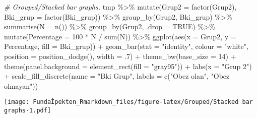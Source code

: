 \documentclass[
]{article}
\newenvironment{Shaded}{\begin{snugshade}}{\end{snugshade}}
\newcommand{\AttributeTok}[1]{\textcolor[rgb]{0.77,0.63,0.00}{#1}}
\newcommand{\CommentTok}[1]{\textcolor[rgb]{0.56,0.35,0.01}{\textit{#1}}}
\newcommand{\ConstantTok}[1]{\textcolor[rgb]{0.00,0.00,0.00}{#1}}
\newcommand{\DecValTok}[1]{\textcolor[rgb]{0.00,0.00,0.81}{#1}}
\newcommand{\FunctionTok}[1]{\textcolor[rgb]{0.00,0.00,0.00}{#1}}
\newcommand{\NormalTok}[1]{#1}
\newcommand{\SpecialCharTok}[1]{\textcolor[rgb]{0.00,0.00,0.00}{#1}}
\newcommand{\StringTok}[1]{\textcolor[rgb]{0.31,0.60,0.02}{#1}}
\begin{document}
\begin{Shaded}
\begin{Highlighting}[]
\CommentTok{\# Grouped/Stacked bar graphs.}
\NormalTok{tmp }\SpecialCharTok{\%\textgreater{}\%}
  \FunctionTok{mutate}\NormalTok{(}\AttributeTok{Grup2 =} \FunctionTok{factor}\NormalTok{(Grup2), }\AttributeTok{Bki\_grup =} \FunctionTok{factor}\NormalTok{(Bki\_grup)) }\SpecialCharTok{\%\textgreater{}\%}
  \FunctionTok{group\_by}\NormalTok{(Grup2, Bki\_grup) }\SpecialCharTok{\%\textgreater{}\%}
  \FunctionTok{summarise}\NormalTok{(}\AttributeTok{N =} \FunctionTok{n}\NormalTok{()) }\SpecialCharTok{\%\textgreater{}\%}
  \FunctionTok{group\_by}\NormalTok{(Grup2, }\AttributeTok{.drop =} \ConstantTok{TRUE}\NormalTok{) }\SpecialCharTok{\%\textgreater{}\%}
  \FunctionTok{mutate}\NormalTok{(}\AttributeTok{Percentage =} \DecValTok{100} \SpecialCharTok{*}\NormalTok{ N }\SpecialCharTok{/} \FunctionTok{sum}\NormalTok{(N)) }\SpecialCharTok{\%\textgreater{}\%}
  \FunctionTok{ggplot}\NormalTok{(}\FunctionTok{aes}\NormalTok{(}\AttributeTok{x =}\NormalTok{ Grup2, }\AttributeTok{y =}\NormalTok{ Percentage, }\AttributeTok{fill =}\NormalTok{ Bki\_grup)) }\SpecialCharTok{+} 
    \FunctionTok{geom\_bar}\NormalTok{(}\AttributeTok{stat =} \StringTok{"identity"}\NormalTok{, }\AttributeTok{colour =} \StringTok{"white"}\NormalTok{, }
             \AttributeTok{position =} \FunctionTok{position\_dodge}\NormalTok{(), }\AttributeTok{width =}\NormalTok{ .}\DecValTok{7}\NormalTok{) }\SpecialCharTok{+}
    \FunctionTok{theme\_bw}\NormalTok{(}\AttributeTok{base\_size =} \DecValTok{14}\NormalTok{) }\SpecialCharTok{+} 
    \FunctionTok{theme}\NormalTok{(}\AttributeTok{panel.background =} \FunctionTok{element\_rect}\NormalTok{(}\AttributeTok{fill =} \StringTok{"gray95"}\NormalTok{)) }\SpecialCharTok{+}
    \FunctionTok{labs}\NormalTok{(}\AttributeTok{x =} \StringTok{"Grup 2"}\NormalTok{) }\SpecialCharTok{+} 
    \FunctionTok{scale\_fill\_discrete}\NormalTok{(}\AttributeTok{name =} \StringTok{"Bki Grup"}\NormalTok{, }
                        \AttributeTok{labels =} \FunctionTok{c}\NormalTok{(}\StringTok{"Obez olan"}\NormalTok{, }\StringTok{"Obez olmayan"}\NormalTok{))}
\end{Highlighting}
\end{Shaded}

\texttt{[image: Fundaİpekten\_Rmarkdown\_files/figure-latex/Grouped/Stacked bar graphs-1.pdf]}
\end{document}
